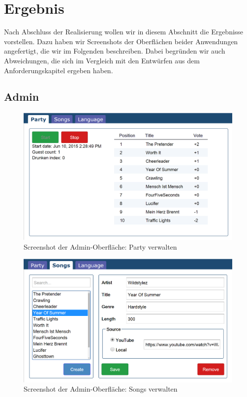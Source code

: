 \section{Ergebnis}
Nach Abschluss der Realisierung wollen wir in diesem Abschnitt die Ergebnisse vorstellen. Dazu haben wir Screenshots der Oberflächen beider Anwendungen angefertigt, die wir im Folgenden beschreiben. Dabei begründen wir auch Abweichungen, die sich im Vergleich mit den Entwürfen aus dem Anforderungskapitel ergeben haben.

\subsection{Admin}


\begin{figure}[tbh]
\centering
\includegraphics[width=1.0\linewidth]{Bilder/Screenshot-Admin-Party}
\caption{Screenshot der Admin-Oberfläche: Party verwalten}
\label{fig:Screenshot-Admin-Party}
\end{figure}

\begin{figure}[tbh]
\centering
\includegraphics[width=1.0\linewidth]{Bilder/Screenshot-Admin-Songs}
\caption{Screenshot der Admin-Oberfläche: Songs verwalten}
\label{fig:Screenshot-Admin-Songs}
\end{figure}

